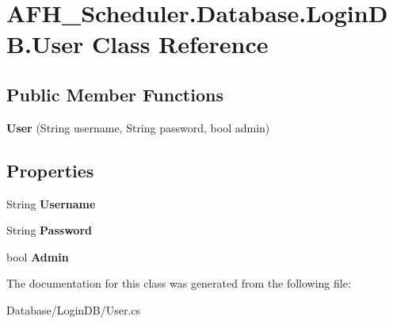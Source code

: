 \section{A\+F\+H\+\_\+\+Scheduler.\+Database.\+Login\+D\+B.\+User Class Reference}
\label{class_a_f_h___scheduler_1_1_database_1_1_login_d_b_1_1_user}
\subsection*{Public Member Functions}
\begin{DoxyCompactItemize}
\item 
\mbox{\label{class_a_f_h___scheduler_1_1_database_1_1_login_d_b_1_1_user_a7731c2735c055294136521be628849a5}} 
{\bfseries User} (String username, String password, bool admin)
\end{DoxyCompactItemize}
\subsection*{Properties}
\begin{DoxyCompactItemize}
\item 
\mbox{\label{class_a_f_h___scheduler_1_1_database_1_1_login_d_b_1_1_user_aec93249270483bd7f8b6391dc9da06f2}} 
String {\bfseries Username}\hspace{0.3cm}{\ttfamily  [get, set]}
\item 
\mbox{\label{class_a_f_h___scheduler_1_1_database_1_1_login_d_b_1_1_user_a45e02fcf5d2d94cc9800a46cb5ba93c4}} 
String {\bfseries Password}\hspace{0.3cm}{\ttfamily  [get, set]}
\item 
\mbox{\label{class_a_f_h___scheduler_1_1_database_1_1_login_d_b_1_1_user_ab22cb29d577634758bfbc7d2b1495960}} 
bool {\bfseries Admin}\hspace{0.3cm}{\ttfamily  [get, set]}
\end{DoxyCompactItemize}


The documentation for this class was generated from the following file\+:\begin{DoxyCompactItemize}
\item 
Database/\+Login\+D\+B/User.\+cs\end{DoxyCompactItemize}
